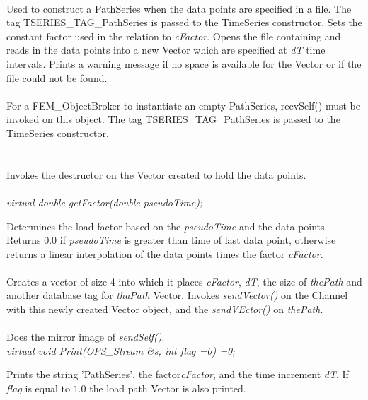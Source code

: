 \\ 
Used to construct a PathSeries when the data points are specified in a
file. The tag TSERIES\_TAG\_PathSeries is passed to the TimeSeries
constructor. Sets the constant factor used in the relation to {\em
cFactor}. Opens the file containing and reads in the data points into
a new Vector which are specified at {\em dT} time intervals. Prints a
warning message if no space is available for the Vector or if the file
could not be found.\\


\\ 
For a FEM\_ObjectBroker to instantiate an empty PathSeries, recvSelf()
must be invoked on this object. The tag TSERIES\_TAG\_PathSeries is
passed to the TimeSeries constructor. \\


 \\
\\ 
Invokes the destructor on the Vector created to hold the data
points. \\


 \\
{\em  virtual double getFactor(double pseudoTime);}

Determines the load factor based on the {\em pseudoTime} and the data
points. Returns $0.0$ if {\em pseudoTime} is greater than time of last
data point, otherwise returns a linear interpolation of the data
points times the factor {\em cFactor}. \\

\\
Creates a vector of size 4 into which it places {\em cFactor}, {\em
dT}, the size of {\em thePath} and another database tag for {\em
thaPath} Vector.  Invokes {\em sendVector()} on the Channel with this
newly created Vector object, and the {\em sendVEctor()} on {\em
thePath}. \\

\\
Does the mirror image of {\em sendSelf()}. \\

{\em  virtual void Print(OPS_Stream \&s, int flag =0) =0;}

Prints the string 'PathSeries', the factor{\em cFactor}, and the time
increment {\em dT}. If {\em flag} is equal to $1.0$ the load path
Vector is also printed.


